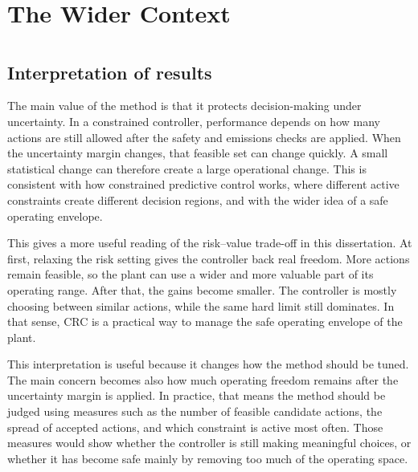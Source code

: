 \documentclass[11pt]{article}
\begin{document}
\section{The Wider Context}\label{the-wider-context}

\section{}\label{section-13}

\subsection{Interpretation of results}\label{interpretation-of-results}

The main value of the method is that it protects decision-making under
uncertainty. In a constrained controller, performance depends on how
many actions are still allowed after the safety and emissions checks are
applied. When the uncertainty margin changes, that feasible set can
change quickly. A small statistical change can therefore create a large
operational change. This is consistent with how constrained predictive
control works, where different active constraints create different
decision regions, and with the wider idea of a safe operating envelope.

This gives a more useful reading of the risk--value trade-off in this
dissertation. At first, relaxing the risk setting gives the controller
back real freedom. More actions remain feasible, so the plant can use a
wider and more valuable part of its operating range. After that, the
gains become smaller. The controller is mostly choosing between similar
actions, while the same hard limit still dominates. In that sense, CRC
is a practical way to manage the safe operating envelope of the plant.

This interpretation is useful because it changes how the method should
be tuned. The main concern becomes also how much operating freedom
remains after the uncertainty margin is applied. In practice, that means
the method should be judged using measures such as the number of
feasible candidate actions, the spread of accepted actions, and which
constraint is active most often. Those measures would show whether the
controller is still making meaningful choices, or whether it has become
safe mainly by removing too much of the operating space.

\subsection{}\label{section-14}
\end{document}

